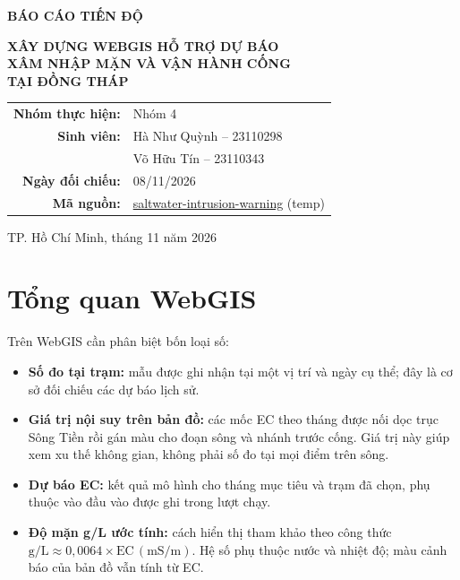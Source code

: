 \documentclass[12pt,a4paper,oneside]{report}
\begin{document}
\begin{titlepage}
\centering
\vspace*{2.5cm}
{\Large\bfseries\color{mainteal} BÁO CÁO TIẾN ĐỘ\par}
\vspace{1.1cm}
{\large\bfseries XÂY DỰNG WEBGIS HỖ TRỢ DỰ BÁO\\
XÂM NHẬP MẶN VÀ VẬN HÀNH CỐNG\\
TẠI ĐỒNG THÁP\par}
\vspace{0.8cm}
\vfill
\begin{tabular}{@{}rl@{}}
\textbf{Nhóm thực hiện:} & Nhóm 4 \\
\textbf{Sinh viên:} & Hà Như Quỳnh -- 23110298 \\
 & Võ Hữu Tín -- 23110343 \\
\textbf{Ngày đối chiếu:} & 08/11/2026 \\
\textbf{Mã nguồn:} & \href{https://github.com/12hqwwo/saltwater-intrusion-warning}{saltwater-intrusion-warning} (temp)
\end{tabular}
\vfill
{TP. Hồ Chí Minh, tháng 11 năm 2026\par}
\vspace*{0.8cm}
\end{titlepage}

\tableofcontents
\clearpage

\chapter{Tổng quan WebGIS}


Trên WebGIS cần phân biệt bốn loại số:
\begin{itemize}
  \item \textbf{Số đo tại trạm:} mẫu được ghi nhận tại một vị trí và ngày cụ thể; đây là cơ sở đối chiếu các dự báo lịch sử.
  \item \textbf{Giá trị nội suy trên bản đồ:} các mốc EC theo tháng được nối dọc trục Sông Tiền rồi gán màu cho đoạn sông và nhánh trước cống. Giá trị này giúp xem xu thế không gian, không phải số đo tại mọi điểm trên sông.
  \item \textbf{Dự báo EC:} kết quả mô hình cho tháng mục tiêu và trạm đã chọn, phụ thuộc vào đầu vào được ghi trong lượt chạy.
  \item \textbf{Độ mặn g/L ước tính:} cách hiển thị tham khảo theo công thức $\mathrm{g/L}\approx0{,}0064\times\mathrm{EC}\,(\mathrm{mS/m})$. Hệ số phụ thuộc nước và nhiệt độ; màu cảnh báo của bản đồ vẫn tính từ EC.
\end{itemize}
\end{document}
